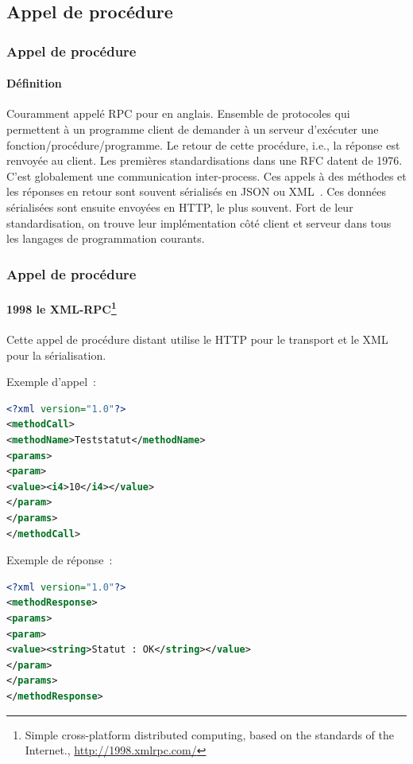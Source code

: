 \documentclass{beamer}
\begin{document}
    \subsection{Appel de procédure}\label{subsec:rpc}

    \begin{frame}
        \transdissolve
        \frametitle{Appel de procédure}
        \framesubtitle{Définition}
        Couramment appelé RPC pour  en anglais.
        \bigbreak
        Ensemble de protocoles qui permettent à un programme client de demander à un serveur d'exécuter une fonction/procédure/programme.
        Le retour de cette procédure, i.e., la réponse est renvoyée au client.
        \bigbreak
        Les premières standardisations dans une RFC datent de 1976.
        \bigbreak
        C'est globalement une communication inter-process.
        \bigbreak
        Ces appels à des méthodes et les réponses en retour sont souvent sérialisés en JSON ou XML~.
        Ces données sérialisées sont ensuite envoyées en HTTP, le plus souvent.
        \bigbreak
        Fort de leur standardisation, on trouve leur implémentation côté client et serveur dans tous les langages de programmation courants.
    \end{frame}

    \begin{frame}[fragile]
        \transdissolve
        \frametitle{Appel de procédure}
        \framesubtitle{1998 le XML-RPC\footnote{Simple cross-platform distributed computing, based on the standards of the Internet., \url{http://1998.xmlrpc.com/}}}
        Cette appel de procédure distant utilise le HTTP pour le transport et le XML pour la sérialisation.

        Exemple d'appel~:
        \begin{lstlisting}[language=xml,basicstyle=\ttfamily\tiny]
<?xml version="1.0"?>
<methodCall>
<methodName>Teststatut</methodName>
<params>
<param>
<value><i4>10</i4></value>
</param>
</params>
</methodCall>
        \end{lstlisting}
        Exemple de réponse~:
        \begin{lstlisting}[language=xml,basicstyle=\ttfamily\tiny]
<?xml version="1.0"?>
<methodResponse>
<params>
<param>
<value><string>Statut : OK</string></value>
</param>
</params>
</methodResponse>
        \end{lstlisting}
    \end{frame}
\end{document}
